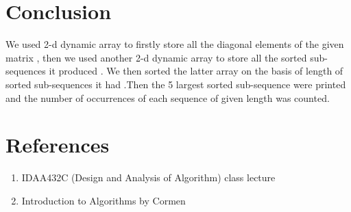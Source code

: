 \documentclass[twocolumn]{article}      %
\begin{document}
\section{Conclusion}
We used 2-d dynamic array to firstly store all the diagonal elements of the given matrix , then we used another 2-d dynamic array to store all the sorted sub-sequences it produced . We then sorted the latter array on the basis of length of sorted sub-sequences it had .Then the 5 largest sorted sub-sequence were printed and the number of occurrences of each sequence of given length was counted. 
\section{References}
\begin{enumerate}
\item IDAA432C (Design and Analysis of Algorithm) class lecture
\item Introduction to Algorithms by Cormen
\end{enumerate}
\end{document}
